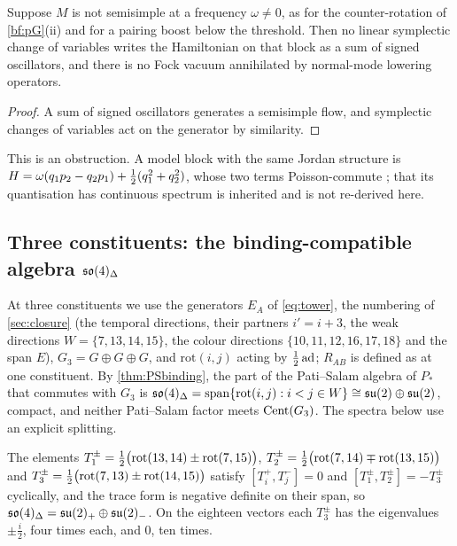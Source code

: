 \begin{corollary}
\label{bf:nofock}
Suppose $M$ is not semisimple at a frequency $\omega\neq0$, as for the counter-rotation of \cref{bf:pG}(ii) and for a pairing boost below the threshold. Then no linear symplectic change of
variables writes the Hamiltonian on that block as a sum of signed oscillators, and there is no Fock vacuum annihilated by normal-mode lowering
operators.
\end{corollary}

\begin{proof}
A sum of signed oscillators generates a semisimple flow, and symplectic changes of variables act on the generator by similarity.
\end{proof}

This is an obstruction. A model block with the same Jordan structure is $H=\omega(q_1p_2-q_2p_1)+\tfrac12(q_1^2+q_2^2)$, whose two terms
Poisson-commute \cite{Williamson36}; that its quantisation has continuous spectrum is inherited and is not re-derived here.

\subsection{\texorpdfstring{Three constituents: the binding-compatible algebra $\mathfrak{so}(4)_\Delta$}{Three constituents: the binding-compatible algebra so(4)Delta}}
\label{sec:bf-three}

At three constituents we use the generators $E_A$ of \eqref{eq:tower}, the numbering of \cref{sec:closure} (the temporal directions, their
partners $i'=i+3$, the weak directions $W=\{7,13,14,15\}$, the colour directions $\{10,11,12,16,17,18\}$ and the span $E$), $G_3=G\oplus G\oplus G$,
and $\mathrm{rot}(i,j)$ acting by $\tfrac12\operatorname{ad}$; $R_{AB}$ is defined as at one constituent. By \cref{thm:PSbinding}, the part of the Pati--Salam
algebra of $P_*$ that commutes with $G_3$ is $\mathfrak{so}(4)_\Delta=\operatorname{span}\{\mathrm{rot}(i,j):i<j\in W\}\cong\mathfrak{su}(2)\oplus\mathfrak{su}(2)$, compact, and neither
Pati--Salam factor meets $\operatorname{Cent}(G_3)$. The spectra below use an explicit splitting.

\begin{lemma}
\label{bf:su2}
The elements $T^\pm_1=\tfrac12\bigl(\mathrm{rot}(13,14)\pm\mathrm{rot}(7,15)\bigr)$, $T^\pm_2=\tfrac12\bigl(\mathrm{rot}(7,14)\mp\mathrm{rot}(13,15)\bigr)$ and
$T^\pm_3=\tfrac12\bigl(\mathrm{rot}(7,13)\pm\mathrm{rot}(14,15)\bigr)$ satisfy $[T^+_i,T^-_j]=0$ and $[T^\pm_1,T^\pm_2]=-T^\pm_3$ cyclically, and the trace
form is negative definite on their span, so $\mathfrak{so}(4)_\Delta=\mathfrak{su}(2)_+\oplus\mathfrak{su}(2)_-$. On the eighteen vectors each $T^\pm_3$ has the eigenvalues $\pm\tfrac i2$,
four times each, and $0$, ten times.
\end{lemma}


